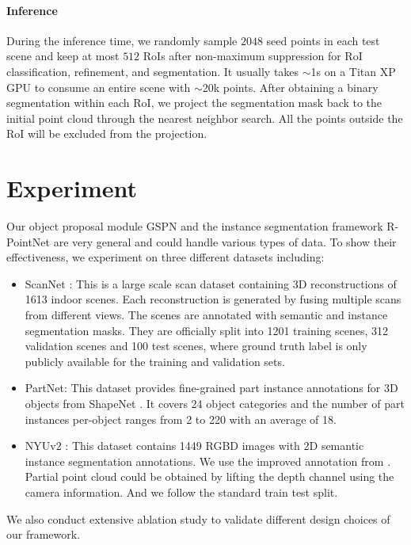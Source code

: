 \documentclass[10pt,twocolumn,letterpaper]{article}
\begin{document}
\vspace{-\baselineskip}
\paragraph{Inference}
During the inference time, we randomly sample $2048$ seed points in each test scene and keep at most $512$ RoIs after non-maximum suppression for RoI classification, refinement, and segmentation. It usually takes $\sim$1s on a Titan XP GPU to consume an entire scene with $\sim$20k points. After obtaining a binary segmentation within each RoI, we project the segmentation mask back to the initial point cloud through the nearest neighbor search. All the points outside the RoI will be excluded from the projection. 
 
\section{Experiment}
Our object proposal module GSPN and the instance segmentation framework R-PointNet are very general and could handle various types of data. To show their effectiveness, we experiment on three different datasets including:
\begin{itemize}
\setlength\itemsep{-0.2em}
    \item ScanNet \cite{dai2017scannet}: This is a large scale scan dataset containing 3D reconstructions of 1613 indoor scenes. Each reconstruction is generated by fusing multiple scans from different views. The scenes are annotated with semantic and instance segmentation masks. They are officially split into 1201 training scenes, 312 validation scenes and 100 test scenes, where ground truth label is only publicly available for the training and validation sets. 
    \item PartNet\cite{mo2018partnet}: This dataset provides fine-grained part instance annotations for 3D objects from ShapeNet \cite{chang2015shapenet}. It covers 24 object categories and the number of part instances per-object ranges from 2 to 220 with an average of 18.
    \item NYUv2 \cite{Silberman:ECCV12}: This dataset contains 1449 RGBD images with 2D semantic instance segmentation annotations. We use the improved annotation from \cite{deng2017amodal}. Partial point cloud could be obtained by lifting the depth channel using the camera information. And we follow the standard train test split.
\end{itemize}
\noindent
We also conduct extensive ablation study to validate different design choices of our framework.
\end{document}
